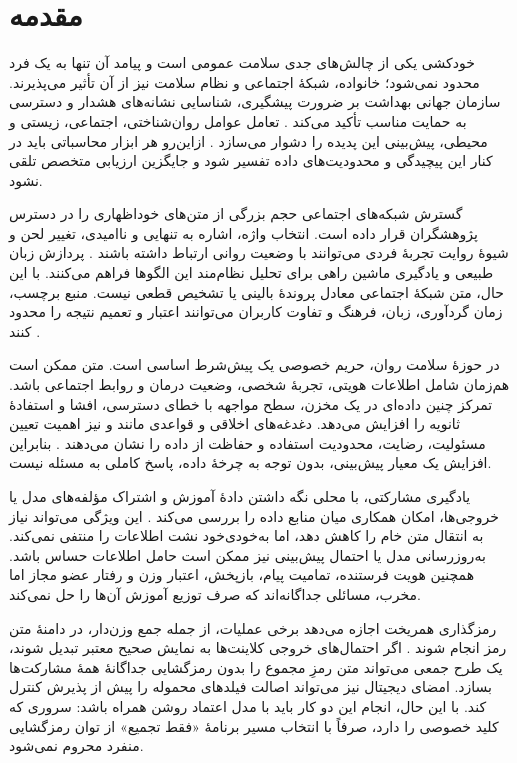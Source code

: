 \chapter*{مقدمه}
\label{chap:introduction}
خودکشی یکی از چالش‌های جدی سلامت عمومی است و پیامد آن تنها به یک فرد محدود نمی‌شود؛ خانواده، شبکۀ اجتماعی و نظام سلامت نیز از آن تأثیر می‌پذیرند. سازمان جهانی بهداشت بر ضرورت پیشگیری، شناسایی نشانه‌های هشدار و دسترسی به حمایت مناسب تأکید می‌کند \cite{ref1}. تعامل عوامل روان‌شناختی، اجتماعی، زیستی و محیطی، پیش‌بینی این پدیده را دشوار می‌سازد \cite{ref3}. ازاین‌رو هر ابزار محاسباتی باید در کنار این پیچیدگی و محدودیت‌های داده تفسیر شود و جایگزین ارزیابی متخصص تلقی نشود.

گسترش شبکه‌های اجتماعی حجم بزرگی از متن‌های خوداظهاری را در دسترس پژوهشگران قرار داده است. انتخاب واژه، اشاره به تنهایی و ناامیدی، تغییر لحن و شیوۀ روایت تجربۀ فردی می‌توانند با وضعیت روانی ارتباط داشته باشند \cite{ref6,ref7,ref8,ref9}. پردازش زبان طبیعی و یادگیری ماشین راهی برای تحلیل نظام‌مند این الگوها فراهم می‌کنند. با این حال، متن شبکۀ اجتماعی معادل پروندۀ بالینی یا تشخیص قطعی نیست. منبع برچسب، زمان گردآوری، زبان، فرهنگ و تفاوت کاربران می‌توانند اعتبار و تعمیم نتیجه را محدود کنند \cite{ref10,ref11}.

در حوزۀ سلامت روان، حریم خصوصی یک پیش‌شرط اساسی است. متن ممکن است هم‌زمان شامل اطلاعات هویتی، تجربۀ شخصی، وضعیت درمان و روابط اجتماعی باشد. تمرکز چنین داده‌ای در یک مخزن، سطح مواجهه با خطای دسترسی، افشا و استفادۀ ثانویه را افزایش می‌دهد. دغدغه‌های اخلاقی و قواعدی مانند  و  نیز اهمیت تعیین مسئولیت، رضایت، محدودیت استفاده و حفاظت از داده را نشان می‌دهند \cite{ref4}. بنابراین افزایش یک معیار پیش‌بینی، بدون توجه به چرخۀ داده، پاسخ کاملی به مسئله نیست.

یادگیری مشارکتی، با محلی نگه داشتن دادۀ آموزش و اشتراک مؤلفه‌های مدل یا خروجی‌ها، امکان همکاری میان منابع داده را بررسی می‌کند \cite{ref15,ref16,ref17}. این ویژگی می‌تواند نیاز به انتقال متن خام را کاهش دهد، اما به‌خودی‌خود نشت اطلاعات را منتفی نمی‌کند. به‌روزرسانی مدل یا احتمال پیش‌بینی نیز ممکن است حامل اطلاعات حساس باشد. همچنین هویت فرستنده، تمامیت پیام، بازپخش، اعتبار وزن و رفتار عضو مجاز اما مخرب، مسائلی جداگانه‌اند که صرف توزیع آموزش آن‌ها را حل نمی‌کند.

رمزگذاری همریخت اجازه می‌دهد برخی عملیات، از جمله جمع وزن‌دار، در دامنۀ متن رمز انجام شوند \cite{ref19,ref20,ref21,ref22}. اگر احتمال‌های خروجی کلاینت‌ها به نمایش صحیح معتبر تبدیل شوند، یک طرح جمعی می‌تواند متن رمزِ مجموع را بدون رمزگشایی جداگانۀ همۀ مشارکت‌ها بسازد. امضای دیجیتال نیز می‌تواند اصالت فیلدهای محموله را پیش از پذیرش کنترل کند. با این حال، انجام این دو کار باید با مدل اعتماد روشن همراه باشد: سروری که کلید خصوصی را دارد، صرفاً با انتخاب مسیر برنامۀ «فقط تجمیع» از توان رمزگشایی منفرد محروم نمی‌شود.

